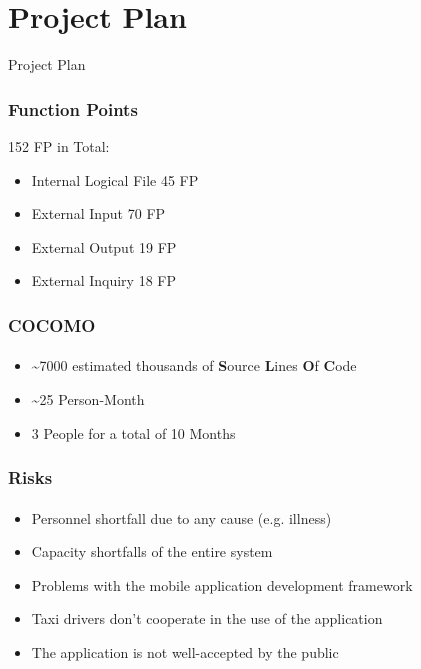 \documentclass[10pt,xcolor={usenames,dvipsnames}]{beamer}
\begin{document}

\section[Section]{Project Plan}
\begin{frame}
	\begin{center}
		Project Plan
	\end{center}
\end{frame}
\begin{frame}
	\frametitle{Function Points}
	152 FP in Total:
	\begin{itemize}
		\item Internal Logical File 45 FP
		\item External Input 70 FP
		\item External Output 19 FP
		\item External Inquiry 18 FP
	\end{itemize}
\end{frame}
\begin{frame}
	\frametitle{COCOMO}
	\framesubtitle{}
	\begin{itemize}
		\item \textasciitilde7000 estimated thousands of \textbf{S}ource \textbf{L}ines \textbf{O}f \textbf{C}ode
		\item \textasciitilde25 Person-Month
		\item 3 People for a total of 10 Months
	\end{itemize}
\end{frame}
\begin{frame}
	\frametitle{Risks}
	\framesubtitle{}
	\begin{itemize}
		\item	Personnel shortfall due to any cause (e.g. illness)
		\item	Capacity shortfalls of the entire system
		\item	Problems with the mobile application development framework
		\item	Taxi drivers don't cooperate in the use of the application
		\item	The application is not well-accepted by the public
	\end{itemize}
\end{frame}
\end{document}
